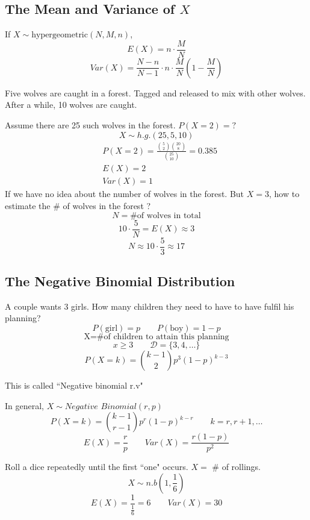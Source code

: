\subsection{The Mean and Variance of $X$}
\begin{prop}
If $X \sim \text{hypergeometric}(N,M,n)$,
\[E(X)=n \cdot \frac{M}{N}\]
\[Var(X)=\frac{N-n}{N-1}\cdot n \cdot\frac{M}{N}\left(1-\frac{M}{N}\right)\]
\end{prop}

\begin{exmp}
Five wolves are caught in a forest. Tagged and released to mix with other wolves. After a while, 10 wolves are caught.

Assume there are 25 such wolves in the forest. $P(X=2)=?$
\[X \sim h.g.(25,5,10)\]
\begin{align*}
&P(X=2)=\frac{\binom 52 \binom {20}{8}}{\binom {25}{10}}=0.385 \\
&E(X)=2	\\
&Var(X)=1
\end{align*}
If we have no idea about the number of wolves in the forest. But $X=3$, how to estimate the \# of wolves in the forest ?
\[N= \text{\# of wolves in total}\]
\[10 \cdot \frac{5}{N}=E(X)\approx 3\]
\[N \approx 10 \cdot \frac{5}{3}\approx17\]
\end{exmp}

\subsection{The Negative Binomial Distribution}
\begin{exmp}
A couple wants 3 girls. How many children they need to have to have fulfil his planning?
\[P(\text{girl})=p \qquad P(\text{boy})=1-p\]
\[\text{X=\# of children to attain this planning}\]
\[x\geq 3 \qquad \mathcal{D}=\{3,4,\dots\}\]
\[P(X=k)=\binom {k-1}{2} p^3(1-p)^{k-3}\]

This is called ``Negative binomial r.v"
\end{exmp}

\begin{prop}
In general, $X \sim \textit{Negative Binomial}(r,p)$
\[P(X=k)=\binom {k-1}{r-1} p^r (1-p)^{k-r}  \qquad k=r,r+1,\dots	\]
\[E(X)=\frac{r}{p} \qquad  Var(X)=\frac{r(1-p)}{p^2} \]
\end{prop}

\begin{exmp}
Roll a dice repeatedly until the first ``one" occurs. $X =$ \# of rollings.
\[X \sim n.b(1,\frac{1}{6})\]
\[E(X)=\frac{1}{\frac{1}{6}}=6  	\qquad Var(X)=30\]
\end{exmp}

